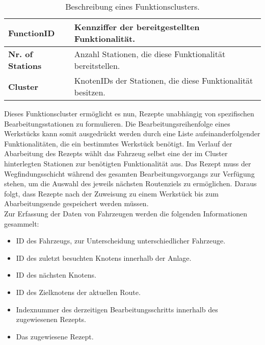 			\begin{table}[H]
				\begin{longtable}{| l | l |}
					
					\hline
					\textbf{FunctionID} & Kennziffer der bereitgestellten Funktionalität.\\ \hline
					\textbf{Nr. of Stations} & Anzahl Stationen, die diese Funktionalität bereitstellen.\\ \hline
					\textbf{Cluster} & KnotenIDs der Stationen, die diese Funktionalität besitzen.\\
					\hline
					
				\end{longtable}
				\vspace{0.2cm}
				\caption{Beschreibung eines Funktionsclusters.}
			\end{table}
			
			Dieses Funktionscluster ermöglicht es nun, Rezepte unabhängig von spezifischen Bearbeitungsstationen zu formulieren. Die Bearbeitungsreihenfolge eines Werkstücks kann somit ausgedrückt werden durch eine Liste aufeinanderfolgender Funktionalitäten, die ein bestimmtes Werkstück benötigt. Im Verlauf der Abarbeitung des Rezepts wählt das Fahrzeug selbst eine der im Cluster hinterlegten Stationen zur benötigten Funktionalität aus. Das Rezept muss der Wegfindungsschicht während des gesamten Bearbeitungsvorgangs zur Verfügung stehen, um die Auswahl des jeweils nächsten Routenziels zu ermöglichen. Daraus folgt, dass Rezepte nach der Zuweisung zu einem Werkstück bis zum Abarbeitungsende gespeichert werden müssen.
			\\[4pt]
			Zur Erfassung der Daten von Fahrzeugen werden die folgenden Informationen gesammelt:
			
			\begin{itemize}
				\item ID des Fahrzeugs, zur Unterscheidung unterschiedlicher Fahrzeuge.
				\item ID des zuletzt besuchten Knotens innerhalb der Anlage.
				\item ID des nächsten Knotens. 
				\item ID des Zielknotens der aktuellen Route.
				\item Indexnummer des derzeitigen Bearbeitungsschritts innerhalb des zugewiesenen Rezepts.
				\item Das zugewiesene Rezept.
			\end{itemize} 
			
